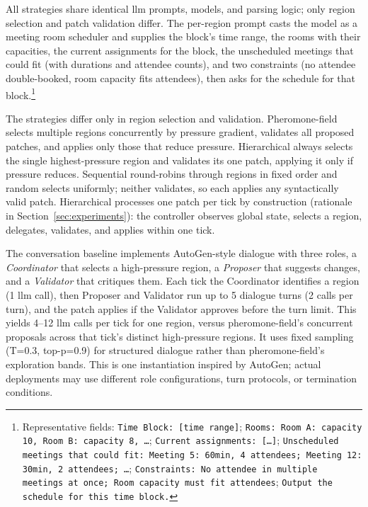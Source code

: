 All strategies share identical \ac{llm} prompts, models, and parsing logic; only region selection and patch validation differ. The per-region prompt casts the model as a meeting room scheduler and supplies the block's time range, the rooms with their capacities, the current assignments for the block, the unscheduled meetings that could fit (with durations and attendee counts), and two constraints (no attendee double-booked, room capacity fits attendees), then asks for the schedule for that block.\footnote{Representative fields: \texttt{Time Block: [time range]}; \texttt{Rooms:\ Room A: capacity 10, Room B: capacity 8, \ldots}; \texttt{Current assignments: [\ldots]}; \texttt{Unscheduled meetings that could fit: Meeting 5: 60min, 4 attendees; Meeting 12: 30min, 2 attendees; \ldots}; \texttt{Constraints: No attendee in multiple meetings at once; Room capacity must fit attendees}; \texttt{Output the schedule for this time block.}}

The strategies differ only in region selection and validation. Pheromone-field selects multiple regions concurrently by pressure gradient, validates all proposed patches, and applies only those that reduce pressure. Hierarchical always selects the single highest-pressure region and validates its one patch, applying it only if pressure reduces. Sequential round-robins through regions in fixed order and random selects uniformly; neither validates, so each applies any syntactically valid patch. Hierarchical processes one patch per tick by construction (rationale in Section~\ref{sec:experiments}): the controller observes global state, selects a region, delegates, validates, and applies within one tick.

The conversation baseline implements AutoGen-style dialogue with three roles, a \emph{Coordinator} that selects a high-pressure region, a \emph{Proposer} that suggests changes, and a \emph{Validator} that critiques them. Each tick the Coordinator identifies a region (1 \ac{llm} call), then Proposer and Validator run up to 5 dialogue turns (2 calls per turn), and the patch applies if the Validator approves before the turn limit. This yields 4--12 \ac{llm} calls per tick for one region, versus pheromone-field's concurrent proposals across that tick's distinct high-pressure regions. It uses fixed sampling (T=0.3, top-p=0.9) for structured dialogue rather than pheromone-field's exploration bands. This is one instantiation inspired by AutoGen; actual deployments may use different role configurations, turn protocols, or termination conditions.

